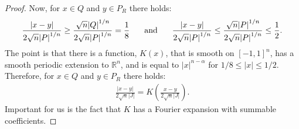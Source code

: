 \documentclass[12pt]{amsart}
\begin{document}
\begin{proof}
Now, for $x\in Q$ and $y\in P_R$ there holds:
\begin{align*}
\frac{{\ensuremath{\left\vert{x-y}\right\vert}}}{2\sqrt{n}{\ensuremath{\left\vert{P}\right\vert}}^{1/n}}
\geq \frac{\sqrt{n}{\ensuremath{\left\vert{Q}\right\vert}}^{1/n}}{2\sqrt{n}{\ensuremath{\left\vert{P}\right\vert}}^{1/n}}
=\frac{1}{8}
\hspace{.2in}
\textnormal{ and }
\hspace{.2in}
\frac{{\ensuremath{\left\vert{x-y}\right\vert}}}{2\sqrt{n}{\ensuremath{\left\vert{P}\right\vert}}^{1/n}}
\leq \frac{\sqrt{n}{\ensuremath{\left\vert{P}\right\vert}}^{1/n}}{2\sqrt{n}{\ensuremath{\left\vert{P}\right\vert}}^{1/n}}
\leq \frac{1}{2}.
\end{align*}
The point is that there is a function, $K(x)$, that is smooth
on $[-1,1]^{n}$, has a smooth periodic extension to $\mathbb{R}^n$, and is
equal to ${\ensuremath{\left\vert{x}\right\vert}}^{n-\alpha}$ for $1/8\leq{\ensuremath{\left\vert{x}\right\vert}}\leq 1/2$.
Therefore, for $x\in Q$ and $y\in P_R$ there holds:
\begin{align*}
\frac{{\ensuremath{\left\vert{x-y}\right\vert}}}{2\sqrt{n}{\ensuremath{\left\vert{J}\right\vert}}}
=K\left(\frac{x-y}{2\sqrt{n}{\ensuremath{\left\vert{J}\right\vert}}}\right).
\end{align*}
Important for us is the fact that $K$ has a Fourier 
expansion with summable coefficients. 


\end{proof}
\end{document}
